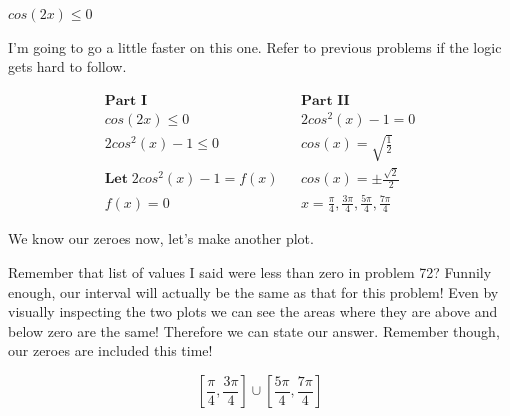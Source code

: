 \documentclass[10pt,letterpaper]{amspset}
\begin{document}
\begin{problem}[73]
    $cos(2x) \leq 0$
\end{problem}

\begin{solution}
    I'm going to go a little faster on this one. Refer to previous problems if the logic gets hard to follow.
    
    \begin{align}
        \textbf{Part I} && \textbf{Part II} \\
        cos(2x) \leq 0 && 2cos^2(x) - 1 = 0 \\
        2cos^2(x) - 1 \leq 0 && cos(x) = \sqrt{\frac{1}{2}} \\
        \textbf{Let} \; 2cos^2(x) - 1 = f(x) && cos(x) = \pm \frac{\sqrt{2}}{2} \\
        f(x) = 0 && x = \frac{\pi}{4}, \frac{3\pi}{4}, \frac{5\pi}{4}, \frac{7\pi}{4}
    \end{align}
    
    We know our zeroes now, let's make another plot.
    
    
    Remember that list of values I said were less than zero in problem 72? Funnily enough, our interval will actually be the same as that for this problem! Even by visually inspecting the two plots we can see the areas where they are above and below zero are the same! Therefore we can state our answer. Remember though, our zeroes are included this time! 
    
    \[\boxed{ \left[\frac{\pi}{4}, \frac{3\pi}{4} \right] \cup \left[ \frac{5\pi}{4}, \frac{7\pi}{4} \right]  }\]
\end{solution}
\end{document}
